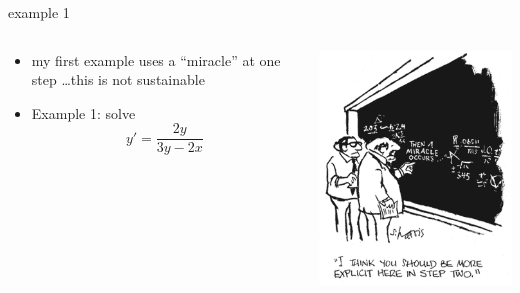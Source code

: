 \documentclass{beamer}
\begin{document}
\begin{frame}{example 1}

\begin{columns}
\begin{column}{0.65\textwidth}
\begin{itemize}
\item my first example uses a ``miracle'' at one step \dots this is not sustainable
\item Example 1: solve
    $$y' = \frac{2y}{3y-2x}$$

\vspace{40mm}
\end{itemize}
\end{column}
\begin{column}{0.35\textwidth}
\includegraphics[width=\textwidth]{figs/miracle}

\vspace{20mm}
\end{column}
\end{columns}
\end{frame}
\end{document}

